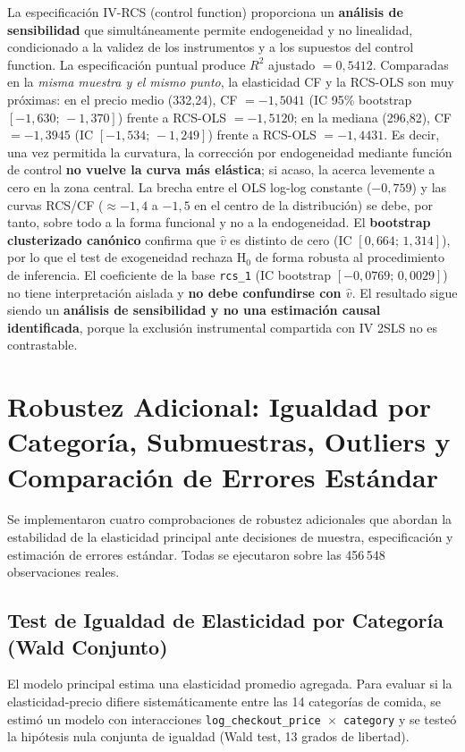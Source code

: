\documentclass[doc, a4paper, biblatex, floatsintext, longtable, babel]{apa7}
\begin{document}
La especificación IV-RCS (control function) proporciona un \textbf{análisis de sensibilidad} que simultáneamente permite endogeneidad y no linealidad, condicionado a la validez de los instrumentos y a los supuestos del control function. La especificación puntual produce $R^2$ ajustado $=0,5412$. Comparadas en la \emph{misma muestra y el mismo punto}, la elasticidad CF y la RCS-OLS son muy próximas: en el precio medio (332,24), CF $=-1,5041$ (IC 95\% bootstrap $[-1,630;\,-1,370]$) frente a RCS-OLS $=-1,5120$; en la mediana (296,82), CF $=-1,3945$ (IC $[-1,534;\,-1,249]$) frente a RCS-OLS $=-1,4431$. Es decir, una vez permitida la curvatura, la corrección por endogeneidad mediante función de control \textbf{no vuelve la curva más elástica}; si acaso, la acerca levemente a cero en la zona central. La brecha entre el OLS log-log constante ($-0,759$) y las curvas RCS/CF ($\approx -1,4$ a $-1,5$ en el centro de la distribución) se debe, por tanto, sobre todo a la forma funcional y no a la endogeneidad. El \textbf{bootstrap clusterizado canónico} confirma que $\hat{v}$ es distinto de cero (IC $[0,664;\,1,314]$), por lo que el test de exogeneidad rechaza H$_0$ de forma robusta al procedimiento de inferencia. El coeficiente de la base \texttt{rcs\_1} (IC bootstrap $[-0,0769;\,0,0029]$) no tiene interpretación aislada y \textbf{no debe confundirse con $\hat{v}$}. El resultado sigue siendo un \textbf{análisis de sensibilidad y no una estimación causal identificada}, porque la exclusión instrumental compartida con IV 2SLS no es contrastable.

\section{Robustez Adicional: Igualdad por Categoría, Submuestras, Outliers y Comparación de Errores Estándar}
\label{sec:robustez_adicional_23}

Se implementaron cuatro comprobaciones de robustez adicionales que abordan la estabilidad de la elasticidad principal ante decisiones de muestra, especificaci\'on y estimaci\'on de errores estándar. Todas se ejecutaron sobre las 456\,548 observaciones reales.

\subsection{Test de Igualdad de Elasticidad por Categor\'ia (Wald Conjunto)}
\label{subsec:wald_categoria}

El modelo principal estima una elasticidad promedio agregada. Para evaluar si la elasticidad-precio difiere sistem\'aticamente entre las 14 categorías de comida, se estimó un modelo con interacciones \texttt{log\_checkout\_price $\times$ category} y se testeó la hipótesis nula conjunta de igualdad (Wald test, 13 grados de libertad).
\end{document}
